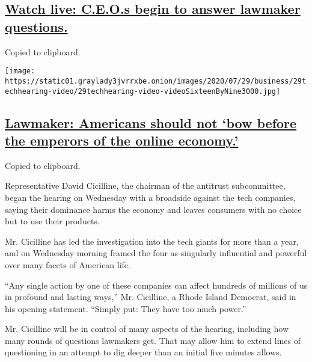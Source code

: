 \hypertarget{watch-live-ceos-begin-to-answer-lawmaker-questions}{%
\subsection{\texorpdfstring{\protect\hyperlink{watch-live-ceos-begin-to-answer-lawmaker-questions}{Watch
live: C.E.O.s begin to answer lawmaker
questions.}}{Watch live: C.E.O.s begin to answer lawmaker questions.}}\label{watch-live-ceos-begin-to-answer-lawmaker-questions}}

Copied to clipboard.

\texttt{[image: https://static01.graylady3jvrrxbe.onion/images/2020/07/29/business/29techhearing-video/29techhearing-video-videoSixteenByNine3000.jpg]}

\hypertarget{lawmaker-americans-should-not-bow-before-the-emperors-of-the-online-economy}{%
\subsection{\texorpdfstring{\protect\hyperlink{lawmaker-americans-should-not-bow-before-the-emperors-of-the-online-economy}{Lawmaker:
Americans should not `bow before the emperors of the online
economy.'}}{Lawmaker: Americans should not `bow before the emperors of the online economy.'}}\label{lawmaker-americans-should-not-bow-before-the-emperors-of-the-online-economy}}

Copied to clipboard.

Representative David Cicilline, the chairman of the antitrust
subcommittee, began the hearing on Wednesday with a broadside against
the tech companies, saying their dominance harms the economy and leaves
consumers with no choice but to use their products.

Mr. Cicilline has led the investigation into the tech giants for more
than a year, and on Wednesday morning framed the four as singularly
influential and powerful over many facets of American life.

``Any single action by one of these companies can affect hundreds of
millions of us in profound and lasting ways,'' Mr. Cicilline, a Rhode
Island Democrat, said in his opening statement. ``Simply put: They have
too much power.''

Mr. Cicilline will be in control of many aspects of the hearing,
including how many rounds of questions lawmakers get. That may allow him
to extend lines of questioning in an attempt to dig deeper than an
initial five minutes allows.

